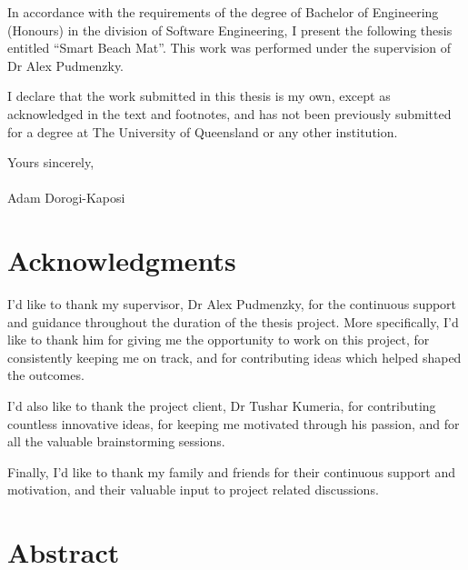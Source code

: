 \documentclass[12pt,openany,a4paper]{book}
\renewcommand{\baselinestretch}{1.2}	%
\begin{document}
In accordance with the requirements of the degree of Bachelor of
Engineering (Honours) in the division of Software Engineering, I present the
following thesis entitled ``Smart Beach Mat''.  This work was performed under
the supervision of Dr Alex Pudmenzky.

I declare that the work submitted in this thesis is my own, except as
acknowledged in the text and footnotes, and has not been previously
submitted for a degree at The University of Queensland or any other
institution.

\begin{flushright}
	Yours sincerely,\\
	\medskip
	\emph{}\\
	\medskip
	Adam Dorogi-Kaposi
\end{flushright}

\cleardoublepage


\chapter{Acknowledgments}

I'd like to thank my supervisor, Dr Alex Pudmenzky, for the continuous support
and guidance throughout the duration of the thesis project. More specifically,
I'd like to thank him for giving me the opportunity to work on this project,
for consistently keeping me on track, and for contributing ideas which helped
shaped the outcomes. 

I'd also like to thank the project client, Dr Tushar Kumeria, for
contributing countless innovative ideas, for keeping me motivated through his
passion, and for all the valuable brainstorming sessions.

Finally, I'd like to thank my family and friends for their continuous support
and motivation, and their valuable input to project related discussions.

\cleardoublepage

\chapter{Abstract}

\end{document}
